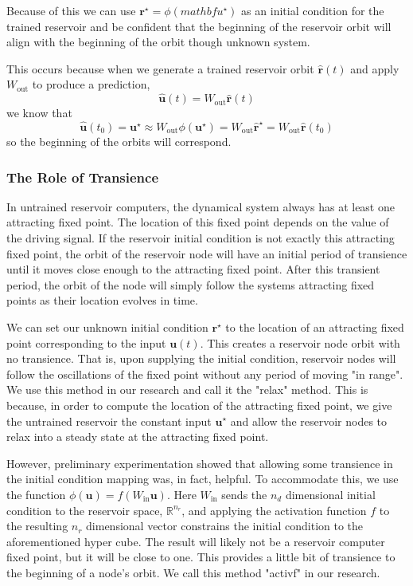 \documentclass{article}
\begin{document}
Because of this we can use $\mathbf{r}^\star = \phi(mathbf{u}^\star)$ as an initial condition for the trained reservoir and be confident that the beginning of the reservoir orbit will align with the beginning of the orbit though unknown system. 

This occurs because when we generate a trained reservoir orbit $\hat{\mathbf{r}}(t)$ and apply $W_\text{out}$ to produce a prediction, 
\[ 
\hat{\mathbf{u}}(t) = W_\text{out} \hat{\mathbf{r}}(t)\]
 we know that 
 \[
 \hat{\mathbf{u}}(t_0) = \mathbf{u}^\star \approx W_\text{out} \phi(\mathbf{u}^\star) =  W_\text{out} \hat{\mathbf{r}}^\star = W_\text{out} \hat{\mathbf{r}}(t_0)
 \]
 so the beginning of the orbits will correspond.

 \subsubsection*{The Role of Transience}

In untrained reservoir computers, the dynamical system always has at least one attracting fixed point. The location of this fixed point depends on the value of the driving signal. If the reservoir initial condition is not exactly this attracting fixed point, the orbit of the reservoir node will have an initial period of transience until it moves close enough to the attracting fixed point. After this transient period, the orbit of the node will simply follow the systems attracting fixed points as their location evolves in time.

We can set our unknown initial condition $\mathbf{r}^\star$ to the location of an attracting fixed point corresponding to the input $\mathbf{u}(t)$. This creates a reservoir node orbit with no transience. That is, upon supplying the initial condition, reservoir nodes will follow the oscillations of the fixed point without any period of moving "in range". We use this method in our research and call it the "relax" method. This is because, in order to compute the location of the attracting fixed point, we give the untrained reservoir the constant input $\mathbf{u}^\star$ and allow the reservoir nodes to relax into a steady state at the attracting fixed point.

However, preliminary experimentation showed that allowing some transience in the initial condition mapping was, in fact, helpful. To accommodate this, we use the function $\phi(\mathbf{u}) = f(W_\text{in} \mathbf{u})$. 
Here $W_\text{in}$ sends the $n_d$ dimensional initial condition to the reservoir space, 
$\mathbb{R}^{n_r}$, and 
applying the activation function $f$ to the resulting $n_r$ dimensional vector constrains the initial condition to the aforementioned hyper cube. The result will likely not be a reservoir computer fixed point, but it will be close to one. This provides a little bit of transience to the beginning of a node's orbit. We call this method "activf" in our research.
\end{document}
